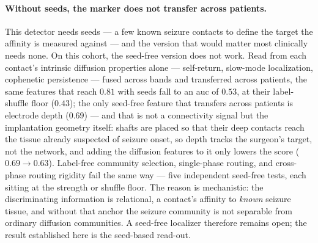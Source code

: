 \paragraph{Without seeds, the marker does not transfer across patients.}
This detector needs seeds --- a few known seizure contacts to define the target the affinity is measured against --- and the version that would matter most clinically needs none. On this cohort, the seed-free version does not work. Read from each contact's intrinsic diffusion properties alone --- self-return, slow-mode localization, cophenetic persistence --- fused across bands and transferred across patients, the same features that reach \(0.81\) with seeds fall to an \gls{auc} of \(0.53\), at their label-shuffle floor (\(0.43\)); the only seed-free feature that transfers across patients is electrode depth (\(0.69\)) --- and that is not a connectivity signal but the implantation geometry itself: shafts are placed so that their deep contacts reach the tissue already suspected of seizure onset, so depth tracks the surgeon's target, not the network, and adding the diffusion features to it only lowers the score (\(0.69 \to 0.63\)). Label-free community selection, single-phase routing, and cross-phase routing rigidity fail the same way --- five independent seed-free tests, each sitting at the strength or shuffle floor. The reason is mechanistic: the discriminating information is relational, a contact's affinity to \emph{known} seizure tissue, and without that anchor the seizure community is not separable from ordinary diffusion communities. A seed-free localizer therefore remains open; the result established here is the seed-based read-out.
